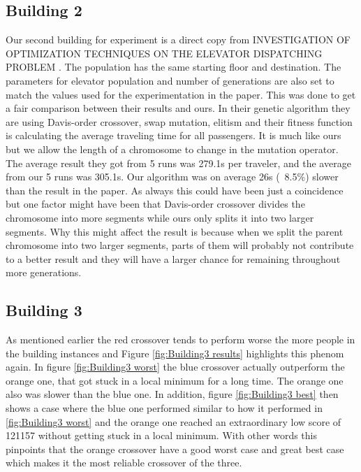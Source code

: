 \newpage

\subsection{Building 2}
Our second building for experiment is a direct copy from INVESTIGATION OF OPTIMIZATION TECHNIQUES ON THE ELEVATOR DISPATCHING PROBLEM \cite{gharieb2005optimal}. The population has the same starting floor and destination. The parameters for elevator population and number of generations are also set to match the values used for the experimentation in the paper. This was done to get a fair comparison between their results and ours. In their genetic algorithm they are using Davis-order crossover, swap mutation, elitism and their fitness function is calculating the average traveling time for all passengers. It is much like ours but we allow the length of a chromosome to change in the mutation operator. The average result they got from 5 runs was 279.1s per traveler, and the average from our 5 runs was 305.1s. Our algorithm was on average 26s (~8.5\%) slower than the result in the paper. As always this could have been just a coincidence but one factor might have been that Davis-order crossover divides the chromosome into more segments while ours only splits it into two larger segments. Why this might affect the result is because when we split the parent chromosome into two larger segments, parts of them will probably not contribute to a better result and they will have a larger chance for remaining throughout more generations.

\newpage

\subsection{Building 3}
As mentioned earlier the red crossover tends to perform worse the more people in the building instances and Figure \ref{fig:Building3 results} highlights this phenom again. In figure \ref{fig:Building3 worst} the blue crossover actually outperform the orange one, that got stuck in a local minimum for a long time. The orange one also was slower than the blue one. In addition, figure \ref{fig:Building3 best} then shows a case where the blue one performed similar to how it performed in \ref{fig:Building3 worst} and the orange one reached an extraordinary low score of 121157 without getting stuck in a local minimum. With other words this pinpoints that the orange crossover have a good worst case and great best case which makes it the most reliable crossover of the three.

